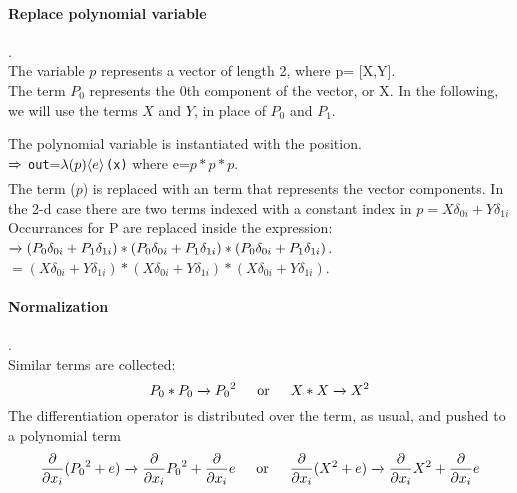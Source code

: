 \documentclass{article}
\begin{document}
\paragraph{Replace polynomial variable}.\\
The variable $p$ represents a vector of length 2, where p= [X,Y].\\
The term $P_0$ represents the 0th component of the vector, or X.
In the following, we will use the terms $X$ and $Y$, in place of $P_0$ and $P_1$.


The polynomial variable is instantiated with the position.\\
$\xRightarrow[]{} $ \lstinline[mathescape=true]!out!=$\lambda(p) {\left\langle{e}\right\rangle}_{}$\lstinline[mathescape=true]!(x)! where e=$p*p*p$.\\
The \name{} term ($p$) is replaced with an \name{} term that represents the vector components.
 In the 2-d case there are two terms indexed with a constant index in 
$p = X \delta_{0i}+Y \delta_{1i}$\\


Occurrances for P are replaced inside the expression:\\ 
$\xrightarrow[]{} (P_0 \delta_{0i}+P_1 \delta_{1i})*(P_0 \delta_{0i}+P_1 \delta_{1i})*(P_0 \delta_{0i}+P_1 \delta_{1i})$.\\
$= (X \delta_{0i}+Y \delta_{1i})*(X \delta_{0i}+Y \delta_{1i})*(X \delta_{0i}+Y\delta_{1i})$.\\




\paragraph{Normalization}.\\
Similar terms are collected:\\
$$P_0*P_0\rewriteEINEXP \expPolyTerm{P_0}{2} \indent \text{or}\indent X*X\rewriteEINEXP \expPolyTerm{X}{2} $$ 
The differentiation operator is distributed over the \name{} term, as usual,  and pushed to a polynomial term\\
 $$\frac{\partial}{\partial x_i} (\expPolyTerm{P_0}{2}+e) \rewriteEINEXP \expPolyTermD{P_0}{2}{i} + \frac{\partial}{\partial x_i}  e
 \indent \text{or}\indent
 \frac{\partial}{\partial x_i} (\expPolyTerm{X}{2}+e) \rewriteEINEXP \expPolyTermD{X}{2}{i} +\frac{\partial}{\partial x_i}  e
 $$
\end{document}
